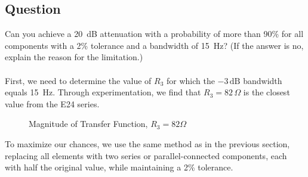 \documentclass[hidelinks,12pt]{article}
\begin{document}
	\pagebreak
	
	
	\subsection{Question}
	Can you achieve a 20~dB attenuation with a probability of more than 90\% for all components with a 2\% tolerance and a bandwidth of 15~Hz? (If the answer is no, explain the reason for the limitation.)\\ \\
	First, we need to determine the value of \( R_3 \) for which the \(-3\,\text{dB}\) bandwidth equals 15~Hz. Through experimentation, we find that \( R_3 = 82\,\Omega \) is the closest value from the E24 series.
	
	\begin{figure}[!h]
		\centering
		\caption{Magnitude of Transfer Function, $R_3 = 82 \Omega$}
	\end{figure}
	
	To maximize our chances, we use the same method as in the previous section, replacing all elements with two series or parallel-connected components, each with half the original value, while maintaining a 2\% tolerance.
	
\end{document}
